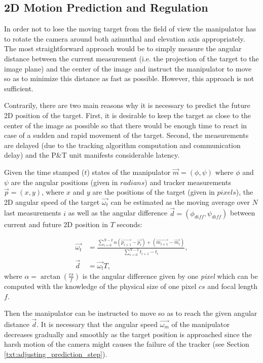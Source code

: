 \subsection{2D Motion Prediction and Regulation} \label{txt:2d_motion_prediction_and_regulation}

In order not to lose the moving target from the field of view the manipulator has to rotate the camera around both azimuthal and elevation axis appropriately. The most straightforward approach would be to simply measure the angular distance between the current measurement (i.e. the projection of the target to the image plane) and the center of the image and instruct the manipulator to move so as to minimize this distance as fast as possible. However, this approach is not sufficient. 

Contrarily, there are two main reasons why it is necessary to predict the future 2D position of the target. First, it is desirable to keep the target as close to the center of the image as possible so that there would be enough time to react in case of a sudden and rapid movement of the target. Second, the measurements are delayed (due to the tracking algorithm computation and communication delay) and the P\&T unit manifests considerable latency.

Given the time stamped ($t$) states of the manipulator $\vec{m} = (\phi, \psi)$ where $\phi$ and $\psi$ are the angular positions (given in $radians$) and tracker measurements $\vec{p} = (x, y)$, where $x$ and $y$ are the positions of the target (given in $pixels$), the 2D angular speed of the target $\vec{\omega_{t}}$ can be estimated as the moving average over $N$ last measurements $i$ as well as the angular difference $\vec{d} = (\phi_{diff}, \psi_{diff})$ between current and future 2D position in $T$ seconds:

\begin{align}
	\vec{\omega_{t}} &= \frac{\sum_{i=0}^{N-2}{\alpha(\vec{p_{i+1}} - \vec{p_{i}}) + (\vec{m_{i+1}} - \vec{m_{i}})}}{\sum_{i=0}^{N-2}{t_{i+1} - t_{i}}},\\
	\vec{d} &= \vec{\omega_{t}}T,
\end{align}
where $\alpha = \arctan{(\frac{cs}{f})}$ is the angular difference given by one \textit{pixel} which can be computed with the knowledge of the physical size of one pixel $cs$ and focal length $f$.

Then the manipulator can be instructed to move so as to reach the given angular distance $\vec{d}$. It is necessary that the angular speed $\vec{\omega_{m}}$ of the manipulator decreases gradually and smoothly as the target position is approached since the harsh motion of the camera might causes the failure of the tracker (see Section \ref{txt:adjusting_prediction_step}).

